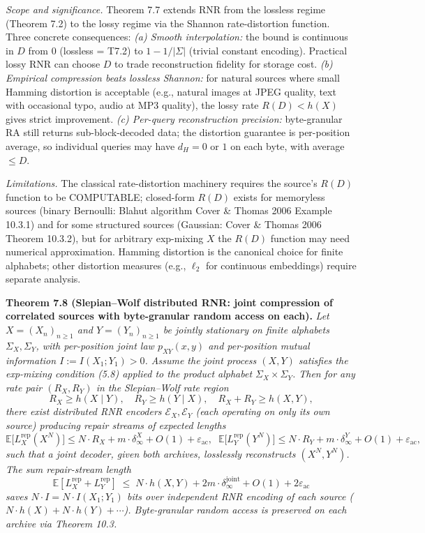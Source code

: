 \documentclass[
]{article}
\begin{document}
\emph{Scope and significance.} Theorem 7.7 extends RNR from the
lossless regime (Theorem 7.2) to the lossy regime via the Shannon
rate-distortion function. Three concrete consequences:
\emph{(a) Smooth interpolation:} the bound is continuous in $D$
from $0$ (lossless = T7.2) to $1 - 1/|\Sigma|$ (trivial constant
encoding). Practical lossy RNR can choose $D$ to trade reconstruction
fidelity for storage cost.
\emph{(b) Empirical compression beats lossless Shannon:} for natural
sources where small Hamming distortion is acceptable (e.g., natural
images at JPEG quality, text with occasional typo, audio at MP3
quality), the lossy rate $R(D) < h(X)$ gives strict improvement.
\emph{(c) Per-query reconstruction precision:} byte-granular RA still
returns sub-block-decoded data; the distortion guarantee is
per-position average, so individual queries may have $d_H = 0$ or $1$
on each byte, with average $\leq D$.

\emph{Limitations.} The classical rate-distortion machinery requires
the source's $R(D)$ function to be COMPUTABLE; closed-form $R(D)$
exists for memoryless sources (binary Bernoulli: Blahut algorithm
Cover \& Thomas 2006 Example 10.3.1) and for some structured
sources (Gaussian: Cover \& Thomas 2006 Theorem 10.3.2), but for
arbitrary exp-mixing $X$ the $R(D)$ function may need numerical
approximation. Hamming distortion is the canonical choice for finite
alphabets; other distortion measures (e.g., $\ell_2$ for continuous
embeddings) require separate analysis.

\textbf{Theorem 7.8 (Slepian--Wolf distributed RNR: joint compression
of correlated sources with byte-granular random access on each).}
\emph{Let $X = (X_n)_{n \geq 1}$ and $Y = (Y_n)_{n \geq 1}$ be jointly
stationary on finite alphabets $\Sigma_X, \Sigma_Y$, with per-position
joint law $p_{XY}(x, y)$ and per-position mutual information $I :=
I(X_1; Y_1) > 0$. Assume the joint process $(X, Y)$ satisfies the
exp-mixing condition (5.8) applied to the product alphabet
$\Sigma_X \times \Sigma_Y$. Then for any rate pair $(R_X, R_Y)$ in the
Slepian--Wolf rate region}
\[
R_X \geq h(X \mid Y), \quad R_Y \geq h(Y \mid X), \quad
R_X + R_Y \geq h(X, Y),
\]
\emph{there exist distributed RNR encoders $\mathcal{E}_X, \mathcal{E}_Y$
(each operating on \emph{only} its own source) producing repair
streams of expected lengths}
\[
\mathbb{E}\bigl[L^{\mathrm{rep}}_X(X^N)\bigr] \leq N \cdot R_X + m \cdot \delta_\infty^{X} + O(1) + \varepsilon_{\mathrm{ac}},
\;\;
\mathbb{E}\bigl[L^{\mathrm{rep}}_Y(Y^N)\bigr] \leq N \cdot R_Y + m \cdot \delta_\infty^{Y} + O(1) + \varepsilon_{\mathrm{ac}},
\]
\emph{such that a joint decoder, given both archives, losslessly
reconstructs $(X^N, Y^N)$. The sum repair-stream length}
\[
\mathbb{E}[L^{\mathrm{rep}}_X + L^{\mathrm{rep}}_Y]
\;\leq\; N \cdot h(X, Y) + 2m \cdot \delta_\infty^{\mathrm{joint}} + O(1) + 2 \varepsilon_{\mathrm{ac}}
\]
\emph{saves $N \cdot I = N \cdot I(X_1; Y_1)$ bits over independent
RNR encoding of each source ($N \cdot h(X) + N \cdot h(Y) + \cdots$).
Byte-granular random access is preserved on each archive via
Theorem 10.3.}
\end{document}
